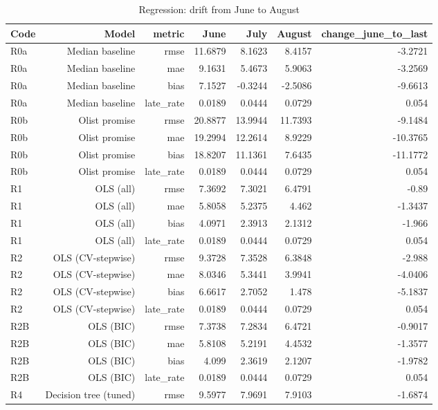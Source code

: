 \begin{table}[htbp]
\centering
\small
\caption{Regression: drift from June to August}
\begin{tabular}{lrrrrrr}
\toprule
Code & Model & metric & June & July & August & change\_june\_to\_last \\
\midrule
R0a & Median baseline & rmse & 11.6879 & 8.1623 & 8.4157 & -3.2721 \\
R0a & Median baseline & mae & 9.1631 & 5.4673 & 5.9063 & -3.2569 \\
R0a & Median baseline & bias & 7.1527 & -0.3244 & -2.5086 & -9.6613 \\
R0a & Median baseline & late\_rate & 0.0189 & 0.0444 & 0.0729 & 0.054 \\
R0b & Olist promise & rmse & 20.8877 & 13.9944 & 11.7393 & -9.1484 \\
R0b & Olist promise & mae & 19.2994 & 12.2614 & 8.9229 & -10.3765 \\
R0b & Olist promise & bias & 18.8207 & 11.1361 & 7.6435 & -11.1772 \\
R0b & Olist promise & late\_rate & 0.0189 & 0.0444 & 0.0729 & 0.054 \\
R1 & OLS (all) & rmse & 7.3692 & 7.3021 & 6.4791 & -0.89 \\
R1 & OLS (all) & mae & 5.8058 & 5.2375 & 4.462 & -1.3437 \\
R1 & OLS (all) & bias & 4.0971 & 2.3913 & 2.1312 & -1.966 \\
R1 & OLS (all) & late\_rate & 0.0189 & 0.0444 & 0.0729 & 0.054 \\
R2 & OLS (CV-stepwise) & rmse & 9.3728 & 7.3528 & 6.3848 & -2.988 \\
R2 & OLS (CV-stepwise) & mae & 8.0346 & 5.3441 & 3.9941 & -4.0406 \\
R2 & OLS (CV-stepwise) & bias & 6.6617 & 2.7052 & 1.478 & -5.1837 \\
R2 & OLS (CV-stepwise) & late\_rate & 0.0189 & 0.0444 & 0.0729 & 0.054 \\
R2B & OLS (BIC) & rmse & 7.3738 & 7.2834 & 6.4721 & -0.9017 \\
R2B & OLS (BIC) & mae & 5.8108 & 5.2191 & 4.4532 & -1.3577 \\
R2B & OLS (BIC) & bias & 4.099 & 2.3619 & 2.1207 & -1.9782 \\
R2B & OLS (BIC) & late\_rate & 0.0189 & 0.0444 & 0.0729 & 0.054 \\
R4 & Decision tree (tuned) & rmse & 9.5977 & 7.9691 & 7.9103 & -1.6874 \\

\end{tabular}
\end{table}
